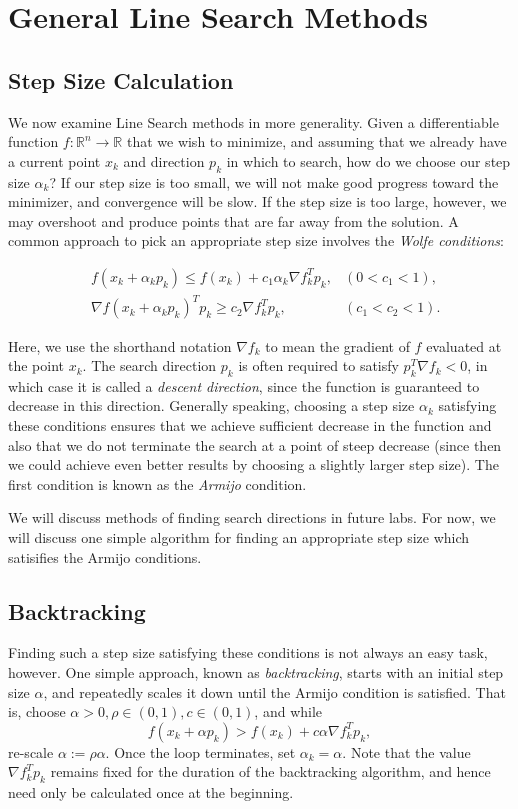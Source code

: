 \section*{General Line Search Methods}
\subsection*{Step Size Calculation}
We now examine Line Search methods in more generality.
Given a differentiable function $f : \mathbb{R}^n \rightarrow \mathbb{R}$ that we wish to minimize, and assuming that we already have a current point $x_k$ and direction $p_k$ in which to search, how do we choose our step size $\alpha_k$? If our step size is too small, we will not make good progress toward the minimizer, and convergence will be slow.
If the step size is too large, however, we may overshoot and produce points that are far away from the solution.
A common approach to pick an appropriate step size involves the \emph{Wolfe conditions}:

\begin{align*}
&f(x_k + \alpha_kp_k) \leq f(x_k) + c_1\alpha_k\nabla f_k^Tp_k, &(0 < c_1 < 1),
\\ &\nabla f(x_k + \alpha_kp_k)^Tp_k \geq c_2\nabla f_k^Tp_k, &(c_1 < c_2 < 1).
\end{align*}

Here, we use the shorthand notation $\nabla f_k$ to mean the gradient of $f$ evaluated at the point $x_k$.
The search direction $p_k$ is often required to satisfy $p_k^T \nabla f_k < 0$, in which case it is called a \emph{descent direction}, since the function is guaranteed to decrease in this direction.
Generally speaking, choosing a step size $\alpha_k$ satisfying these conditions ensures that we achieve sufficient decrease in the function and also that we do not terminate the search at a point of steep decrease (since then we could achieve even better results by choosing a slightly larger step size).
The first condition is known as the \emph{Armijo} condition.

We will discuss methods of finding search directions in future labs.
For now, we will discuss one simple algorithm for finding an appropriate step size which satisifies the Armijo conditions.

\subsection*{Backtracking}

Finding such a step size satisfying these conditions is not always an easy task, however.
One simple approach, known as \emph{backtracking}, starts with an initial step size $\alpha$, and repeatedly scales it down until the Armijo condition is satisfied.
That is, choose $\alpha >0, \rho \in (0, 1), c\in (0, 1)$, and while
$$
f(x_k + \alpha p_k) > f(x_k) + c\alpha\nabla f_k^Tp_k,
$$
re-scale $\alpha := \rho\alpha$.
Once the loop terminates, set $\alpha_k = \alpha$.
Note that the value $\nabla f_k^Tp_k$ remains fixed for the duration of the backtracking algorithm, and hence need only be calculated once at the beginning.

